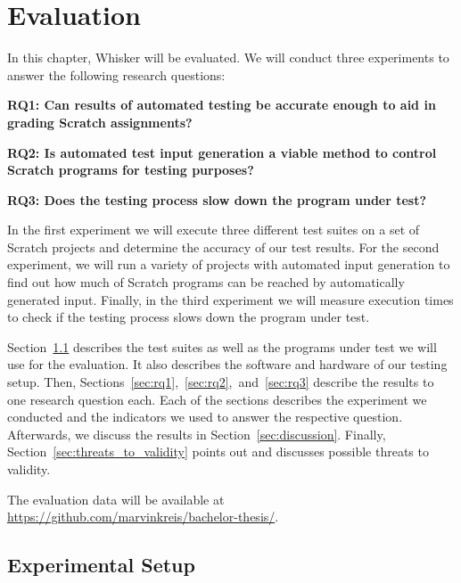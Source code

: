 \chapter{Evaluation}%
\label{cha:evaluation}

In this chapter, Whisker will be evaluated.
We will conduct three experiments to answer the following research questions:

{
    \parspace

    \centering
    \begin{minipage}{.9\textwidth}
        \textbf{RQ1: Can results of automated testing be accurate enough to aid in grading Scratch assignments?}
        \parspace

        \noindent \textbf{RQ2: Is automated test input generation a viable method to control Scratch programs for testing purposes?}
        \parspace

        \noindent \textbf{RQ3: Does the testing process slow down the program under test?}
    \end{minipage}

    \parspace
}


\noindent In the first experiment we will execute three different test suites on a set of Scratch projects
and determine the accuracy of our test results.
For the second experiment, we will run a variety of projects with automated input generation
to find out how much of Scratch programs can be reached by automatically generated input.
Finally, in the third experiment we will measure execution times
to check if the testing process slows down the program under test.
\parspace

Section~\ref{sec:experimental_setup} describes the test suites as well as the programs under test we will use for the evaluation.
It also describes the software and hardware of our testing setup.
Then, Sections~\ref{sec:rq1},~\ref{sec:rq2},~and~\ref{sec:rq3} describe the results to one research question each.
Each of the sections describes the experiment we conducted and the indicators we used
to answer the respective question.
Afterwards, we discuss the results in Section~\ref{sec:discussion}.
Finally, Section~\ref{sec:threats_to_validity} points out and discusses possible threats to validity.%
\parspace

The evaluation data will be available at \url{https://github.com/marvinkreis/bachelor-thesis/}.

\section{Experimental Setup}
\label{sec:experimental_setup}

